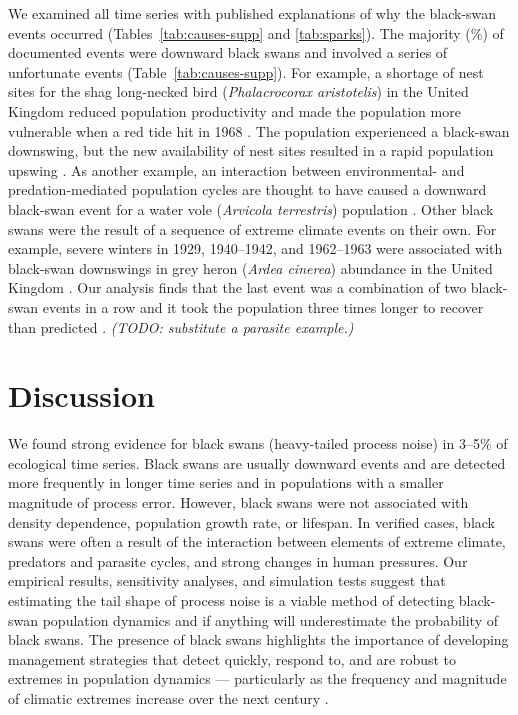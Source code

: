 We examined all time series with published explanations of why the black-swan events occurred (Tables~\ref{tab:causes-supp} and \ref{tab:sparks}). The majority (\percBSDown \%) of documented events were downward black swans and involved a series of unfortunate events (Table~\ref{tab:causes-supp}). For example, a shortage of nest sites for the shag long-necked bird (\textit{Phalacrocorax aristotelis}) in the United Kingdom reduced population productivity and made the population more vulnerable when a red tide hit in 1968 \citep{potts1980}. The population experienced a black-swan downswing, but the new availability of nest sites resulted in a rapid population upswing \citep{potts1980}. As another example, an interaction between environmental- and predation-mediated population cycles are thought to have caused a downward black-swan event for a water vole (\textit{Arvicola terrestris}) population \citep{saucy1994}. Other black swans were the result of a sequence of extreme climate events on their own. For example, severe winters in 1929, 1940--1942, and 1962--1963 were associated with black-swan downswings in grey heron (\textit{Ardea cinerea}) abundance in the United Kingdom \citep{stafford1971}. Our analysis finds that the last event was a combination of two black-swan events in a row and it took the population three times longer to recover than predicted \citep{stafford1971}. \textit{(TODO: substitute a parasite example.)}


\section{Discussion}

We found strong evidence for black swans (heavy-tailed process noise) in 3--5\% of ecological time series. Black swans are usually downward events and are detected more frequently in longer time series and in populations with a smaller magnitude of process error. However, black swans were not associated with density dependence, population growth rate, or lifespan. In verified cases, black swans were often a result of the interaction between elements of extreme climate, predators and parasite cycles, and strong changes in human pressures. Our empirical results, sensitivity analyses, and simulation tests suggest that estimating the tail shape of process noise is a viable method of detecting black-swan population dynamics and if anything will underestimate the probability of black swans. The presence of black swans highlights the importance of developing management strategies that detect quickly, respond to, and are robust to extremes in population dynamics --- particularly as the frequency and magnitude of climatic extremes increase over the next century \citep{easterling2000,ipcc2012}.

